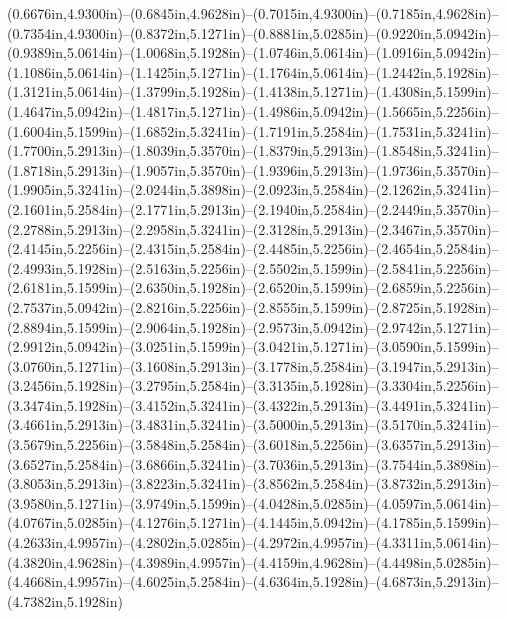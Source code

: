 (0.6676in,4.9300in)--(0.6845in,4.9628in)--(0.7015in,4.9300in)--(0.7185in,4.9628in)--(0.7354in,4.9300in)--(0.8372in,5.1271in)--(0.8881in,5.0285in)--(0.9220in,5.0942in)--(0.9389in,5.0614in)--(1.0068in,5.1928in)--(1.0746in,5.0614in)--(1.0916in,5.0942in)--(1.1086in,5.0614in)--(1.1425in,5.1271in)--(1.1764in,5.0614in)--(1.2442in,5.1928in)--(1.3121in,5.0614in)--(1.3799in,5.1928in)--(1.4138in,5.1271in)--(1.4308in,5.1599in)--(1.4647in,5.0942in)--(1.4817in,5.1271in)--(1.4986in,5.0942in)--(1.5665in,5.2256in)--(1.6004in,5.1599in)--(1.6852in,5.3241in)--(1.7191in,5.2584in)--(1.7531in,5.3241in)--(1.7700in,5.2913in)--(1.8039in,5.3570in)--(1.8379in,5.2913in)--(1.8548in,5.3241in)--(1.8718in,5.2913in)--(1.9057in,5.3570in)--(1.9396in,5.2913in)--(1.9736in,5.3570in)--(1.9905in,5.3241in)--(2.0244in,5.3898in)--(2.0923in,5.2584in)--(2.1262in,5.3241in)--(2.1601in,5.2584in)--(2.1771in,5.2913in)--(2.1940in,5.2584in)--(2.2449in,5.3570in)--(2.2788in,5.2913in)--(2.2958in,5.3241in)--(2.3128in,5.2913in)--(2.3467in,5.3570in)--(2.4145in,5.2256in)--(2.4315in,5.2584in)--(2.4485in,5.2256in)--(2.4654in,5.2584in)--(2.4993in,5.1928in)--(2.5163in,5.2256in)--(2.5502in,5.1599in)--(2.5841in,5.2256in)--(2.6181in,5.1599in)--(2.6350in,5.1928in)--(2.6520in,5.1599in)--(2.6859in,5.2256in)--(2.7537in,5.0942in)--(2.8216in,5.2256in)--(2.8555in,5.1599in)--(2.8725in,5.1928in)--(2.8894in,5.1599in)--(2.9064in,5.1928in)--(2.9573in,5.0942in)--(2.9742in,5.1271in)--(2.9912in,5.0942in)--(3.0251in,5.1599in)--(3.0421in,5.1271in)--(3.0590in,5.1599in)--(3.0760in,5.1271in)--(3.1608in,5.2913in)--(3.1778in,5.2584in)--(3.1947in,5.2913in)--(3.2456in,5.1928in)--(3.2795in,5.2584in)--(3.3135in,5.1928in)--(3.3304in,5.2256in)--(3.3474in,5.1928in)--(3.4152in,5.3241in)--(3.4322in,5.2913in)--(3.4491in,5.3241in)--(3.4661in,5.2913in)--(3.4831in,5.3241in)--(3.5000in,5.2913in)--(3.5170in,5.3241in)--(3.5679in,5.2256in)--(3.5848in,5.2584in)--(3.6018in,5.2256in)--(3.6357in,5.2913in)--(3.6527in,5.2584in)--(3.6866in,5.3241in)--(3.7036in,5.2913in)--(3.7544in,5.3898in)--(3.8053in,5.2913in)--(3.8223in,5.3241in)--(3.8562in,5.2584in)--(3.8732in,5.2913in)--(3.9580in,5.1271in)--(3.9749in,5.1599in)--(4.0428in,5.0285in)--(4.0597in,5.0614in)--(4.0767in,5.0285in)--(4.1276in,5.1271in)--(4.1445in,5.0942in)--(4.1785in,5.1599in)--(4.2633in,4.9957in)--(4.2802in,5.0285in)--(4.2972in,4.9957in)--(4.3311in,5.0614in)--(4.3820in,4.9628in)--(4.3989in,4.9957in)--(4.4159in,4.9628in)--(4.4498in,5.0285in)--(4.4668in,4.9957in)--(4.6025in,5.2584in)--(4.6364in,5.1928in)--(4.6873in,5.2913in)--(4.7382in,5.1928in) 